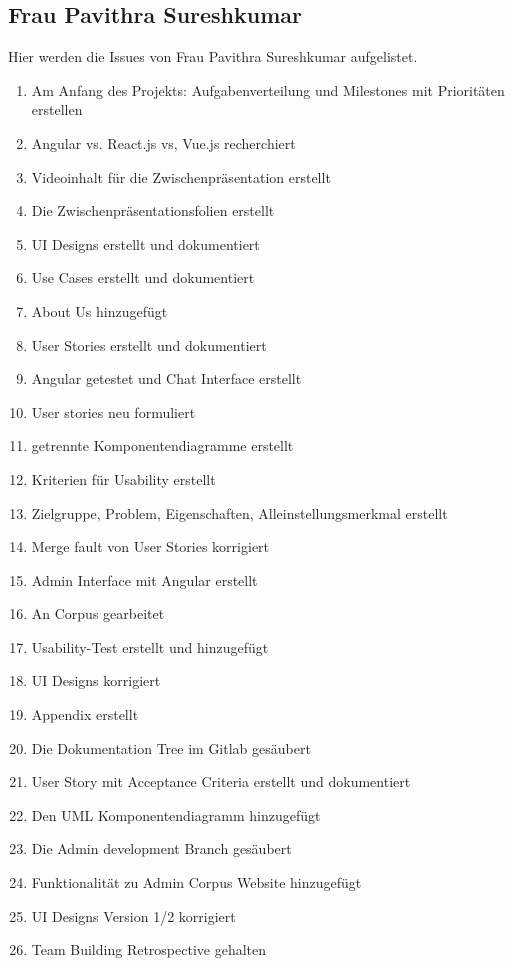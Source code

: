 \subsection{Frau Pavithra Sureshkumar}
Hier werden die Issues von Frau Pavithra Sureshkumar aufgelistet.
\begin{enumerate}
    \item Am Anfang des Projekts: Aufgabenverteilung und Milestones mit Prioritäten erstellen
    \item Angular vs. React.js vs, Vue.js recherchiert
    \item Videoinhalt für die Zwischenpräsentation erstellt
    \item Die Zwischenpräsentationsfolien erstellt
    \item UI Designs erstellt und dokumentiert
    \item Use Cases erstellt und dokumentiert
    \item About Us hinzugefügt
    \item User Stories erstellt und dokumentiert
    \item Angular getestet und Chat Interface erstellt
    \item User stories neu formuliert
    \item getrennte Komponentendiagramme erstellt
    \item Kriterien für Usability erstellt
    \item Zielgruppe, Problem, Eigenschaften, Alleinstellungsmerkmal erstellt
    \item Merge fault von User Stories korrigiert
    \item Admin Interface mit Angular erstellt
    \item An Corpus gearbeitet
    \item Usability-Test erstellt und hinzugefügt
    \item UI Designs korrigiert
    \item Appendix erstellt
    \item Die Dokumentation Tree im Gitlab gesäubert
    \item User Story mit Acceptance Criteria erstellt und dokumentiert
    \item Den UML Komponentendiagramm hinzugefügt
    \item Die Admin development Branch gesäubert
    \item Funktionalität zu Admin Corpus Website hinzugefügt
    \item UI Designs Version 1/2 korrigiert
    \item Team Building Retrospective gehalten

\end{enumerate}
